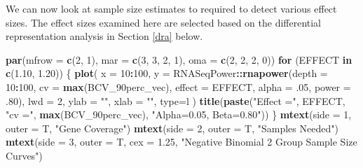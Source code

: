 \documentclass[
]{book}
\newenvironment{Shaded}{\begin{snugshade}}{\end{snugshade}}
\newcommand{\ControlFlowTok}[1]{\textcolor[rgb]{0.13,0.29,0.53}{\textbf{#1}}}
\newcommand{\DataTypeTok}[1]{\textcolor[rgb]{0.13,0.29,0.53}{#1}}
\newcommand{\DecValTok}[1]{\textcolor[rgb]{0.00,0.00,0.81}{#1}}
\newcommand{\FloatTok}[1]{\textcolor[rgb]{0.00,0.00,0.81}{#1}}
\newcommand{\KeywordTok}[1]{\textcolor[rgb]{0.13,0.29,0.53}{\textbf{#1}}}
\newcommand{\NormalTok}[1]{#1}
\newcommand{\OperatorTok}[1]{\textcolor[rgb]{0.81,0.36,0.00}{\textbf{#1}}}
\newcommand{\StringTok}[1]{\textcolor[rgb]{0.31,0.60,0.02}{#1}}
\begin{document}
We can now look at sample size estimates to required to detect
various effect sizes. The effect sizes examined here are selected
based on the differential representation analysis in Section \ref{dra} below.

\begin{Shaded}
\begin{Highlighting}[]
\KeywordTok{par}\NormalTok{(}\DataTypeTok{mfrow =} \KeywordTok{c}\NormalTok{(}\DecValTok{2}\NormalTok{, }\DecValTok{1}\NormalTok{), }\DataTypeTok{mar =} \KeywordTok{c}\NormalTok{(}\DecValTok{3}\NormalTok{, }\DecValTok{3}\NormalTok{, }\DecValTok{2}\NormalTok{, }\DecValTok{1}\NormalTok{), }\DataTypeTok{oma =} \KeywordTok{c}\NormalTok{(}\DecValTok{2}\NormalTok{, }\DecValTok{2}\NormalTok{, }\DecValTok{2}\NormalTok{, }\DecValTok{0}\NormalTok{))}
\ControlFlowTok{for}\NormalTok{ (EFFECT }\ControlFlowTok{in} \KeywordTok{c}\NormalTok{(}\FloatTok{1.10}\NormalTok{, }\FloatTok{1.20}\NormalTok{)) \{}
  \KeywordTok{plot}\NormalTok{(}
    \DataTypeTok{x =} \DecValTok{10}\OperatorTok{:}\DecValTok{100}\NormalTok{, }
    \DataTypeTok{y =}\NormalTok{ RNASeqPower}\OperatorTok{::}\KeywordTok{rnapower}\NormalTok{(}\DataTypeTok{depth =} \DecValTok{10}\OperatorTok{:}\DecValTok{100}\NormalTok{, }\DataTypeTok{cv =} \KeywordTok{max}\NormalTok{(BCV\_90perc\_vec), }
         \DataTypeTok{effect =}\NormalTok{ EFFECT, }\DataTypeTok{alpha =} \FloatTok{.05}\NormalTok{, }\DataTypeTok{power =} \FloatTok{.80}\NormalTok{),}
    \DataTypeTok{lwd =} \DecValTok{2}\NormalTok{, }\DataTypeTok{ylab =} \StringTok{""}\NormalTok{, }\DataTypeTok{xlab =} \StringTok{""}\NormalTok{, }\DataTypeTok{type=}\StringTok{\textquotesingle{}l\textquotesingle{}}
\NormalTok{  )}
  \KeywordTok{title}\NormalTok{(}\KeywordTok{paste}\NormalTok{(}\StringTok{"Effect ="}\NormalTok{, EFFECT, }\StringTok{"cv ="}\NormalTok{, }
     \KeywordTok{max}\NormalTok{(BCV\_90perc\_vec), }\StringTok{"Alpha=0.05, Beta=0.80"}\NormalTok{))}
\NormalTok{\}}
\KeywordTok{mtext}\NormalTok{(}\DataTypeTok{side =} \DecValTok{1}\NormalTok{, }\DataTypeTok{outer =}\NormalTok{ T, }\StringTok{"Gene Coverage"}\NormalTok{)}
\KeywordTok{mtext}\NormalTok{(}\DataTypeTok{side =} \DecValTok{2}\NormalTok{, }\DataTypeTok{outer =}\NormalTok{ T, }\StringTok{"Samples Needed"}\NormalTok{)}
\KeywordTok{mtext}\NormalTok{(}\DataTypeTok{side =} \DecValTok{3}\NormalTok{, }\DataTypeTok{outer =}\NormalTok{ T, }\DataTypeTok{cex =} \FloatTok{1.25}\NormalTok{, }
    \StringTok{"Negative Binomial 2 Group Sample Size Curves"}\NormalTok{)}
\end{Highlighting}
\end{Shaded}
\end{document}
